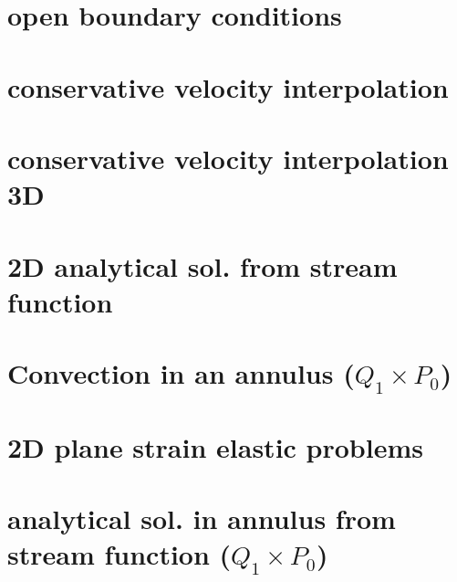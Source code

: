 \documentclass[a4paper,11pt]{report}
\begin{document}
\chapter{open boundary conditions \label{f29}} %

\chapter{conservative velocity interpolation \label{f30}} %

\chapter{conservative velocity interpolation 3D \label{f31}} %

\chapter{2D analytical sol. from stream function \label{f32}} %

\chapter{Convection in an annulus  ($Q_1\times P_0$)  \label{f33}} %

\chapter{2D plane strain elastic problems\label{f34}} %

\chapter{analytical sol. in annulus from stream function ($Q_1\times P_0$) \label{f35}} %
\end{document}

